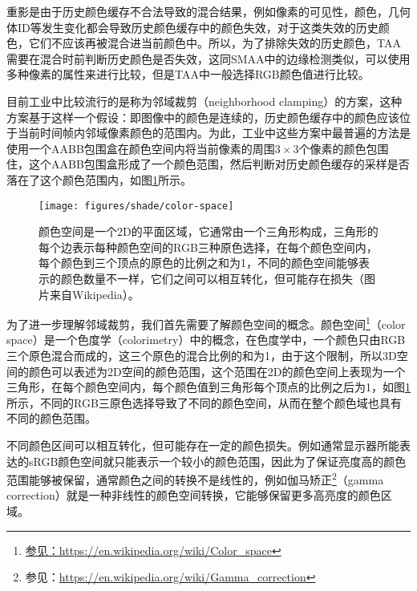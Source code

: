 重影是由于历史颜色缓存不合法导致的混合结果，例如像素的可见性，颜色，几何体ID等发生变化都会导致历史颜色缓存中的颜色失效，对于这类失效的历史颜色，它们不应该再被混合进当前颜色中。所以，为了排除失效的历史颜色，TAA需要在混合时前判断历史颜色是否失效，这同SMAA中的边缘检测类似，可以使用多种像素的属性来进行比较，但是TAA中一般选择RGB颜色值进行比较。

目前工业中\cite{a:AnExcursioninTemporalSupersampling,a:RealtimeglobalilluminationandreflectionsinDust514,a:TemporalAntialiasingInUncharted4,a:TemporalReprojectionAnti-AliasinginINSIDE}比较流行的是称为邻域裁剪（neighborhood clamping）的方案，这种方案基于这样一个假设：即图像中的颜色是连续的，历史颜色缓存中的颜色应该位于当前时间帧内邻域像素颜色的范围内。为此，工业中这些方案中最普遍的方法是使用一个AABB包围盒在颜色空间内将当前像素的周围$3\times 3$个像素的颜色包围住，这个AABB包围盒形成了一个颜色范围，然后判断对历史颜色缓存的采样是否落在了这个颜色范围内，如图\ref{f:shade-clamping}所示。

\begin{figure}
\sidecaption
	\texttt{[image: figures/shade/color-space]}
	\caption{颜色空间是一个2D的平面区域，它通常由一个三角形构成，三角形的每个边表示每种颜色空间的RGB三种原色选择，在每个颜色空间内，每个颜色到三个顶点的原色的比例之和为1，不同的颜色空间能够表示的颜色数量不一样，它们之间可以相互转化，但可能存在损失（图片来自Wikipedia）。}
	\label{f:shade-clamping} %
\end{figure}

为了进一步理解邻域裁剪，我们首先需要了解颜色空间的概念。颜色空间\footnote{\url{参见：https://en.wikipedia.org/wiki/Color_space}}（color space）是一个色度学（colorimetry）中的概念，在色度学中，一个颜色只由RGB三个原色混合而成的，这三个原色的混合比例的和为1，由于这个限制，所以3D空间的颜色可以表述为2D空间的颜色范围，这个范围在2D的颜色空间上表现为一个三角形，在每个颜色空间内，每个颜色值到三角形每个顶点的比例之后为1，如图\ref{f:shade-clamping}所示，不同的RGB三原色选择导致了不同的颜色空间，从而在整个颜色域也具有不同的颜色范围。

不同颜色区间可以相互转化，但可能存在一定的颜色损失。例如通常显示器所能表达的sRGB颜色空间就只能表示一个较小的颜色范围，因此为了保证亮度高的颜色范围能够被保留，通常颜色之间的转换不是线性的，例如伽马矫正\footnote{参见：\url{https://en.wikipedia.org/wiki/Gamma_correction}}（gamma correction）就是一种非线性的颜色空间转换，它能够保留更多高亮度的颜色区域。


